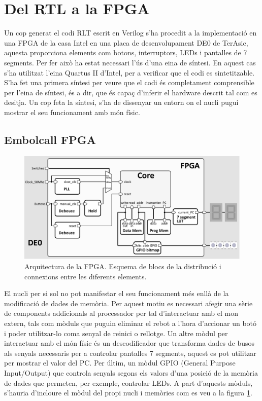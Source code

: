 \documentclass[10pt,a4paper,twocolumn,twoside]{article}
\begin{document}
\section{Del RTL a la FPGA}  %
\label{sec:FPGA}
Un cop generat el codi RLT escrit en Verilog s’ha procedit a la implementació en una FPGA de la casa Intel en una placa de desenvolupament DE0 de TerAsic, aquesta proporciona elements com botons, interruptors, LEDs i pantalles de 7 segments. Per fer això ha estat necessari l'ús d'una eina de síntesi. En aquest cas s’ha utilitzat l'eina Quartus II d'Intel, per a verificar que el codi es sintetitzable. S’ha fet una primera síntesi per veure que el codi és completament comprensible per l’eina de síntesi, és a dir, que és capaç d’inferir el hardware descrit tal com es desitja. 
Un cop feta la síntesi, s'ha de dissenyar un entorn on el nucli pugui mostrar el seu funcionament amb món físic.
    \subsection{Embolcall FPGA}
        \begin{figure}[!ht]
    \centering
    	\includegraphics[width=0.9\linewidth]{pdf/arch_FPGA.pdf}
        \caption{Arquitectura de la FPGA. Esquema de blocs de la distribució i connexions entre les diferents elements.}
        \label{fig:FPGA_arch}
    \end{figure}
    
    El nucli per si sol no pot manifestar el seu funcionament més enllà de la modificació de dades de memòria. Per aquest motiu es necessari afegir una sèrie de components addicionals al processador per tal d’interactuar amb el mon extern, tals com mòduls que puguin eliminar el rebot a l'hora d'accionar un botó i poder utilitzar-lo coma senyal de reinici o rellotge. Un altre mòdul per interactuar amb el món físic és un
    descodificador que transforma dades de busos als senyals necessaris per a controlar pantalles 7 segments, aquest es pot utilitzar per mostrar el valor del PC. Per últim, un mòdul GPIO (General Purpose Input/Output) que controla senyals segons els valors d'una posició de la memòria de dades que permeten, per exemple, controlar LEDs. A part d'aquests mòduls, s'hauria d'incloure el mòdul del propi nucli i memòries com es veu a la figura \ref{fig:FPGA_arch}.
\end{document}
